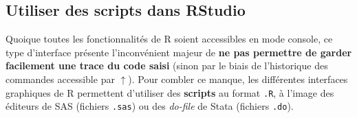 \documentclass[12pt,twosided, notitlepage]{book}
\newenvironment{Shaded}{}{}
\newcommand{\KeywordTok}[1]{\textcolor[rgb]{0.00,0.00,1.00}{#1}}
\newcommand{\DataTypeTok}[1]{#1}
\newcommand{\CommentTok}[1]{\textcolor[rgb]{0.00,0.50,0.00}{#1}}
\newcommand{\NormalTok}[1]{#1}
\newif \ifsol
\renewenvironment{Shaded}{\begin{snugshade}}{\end{snugshade}}
\begin{document}
\begin{enumerate}
  \ifsol 

  \begin{center} \rule{0.5\linewidth}{\linethickness}\end{center}

\begin{Shaded}
\begin{Highlighting}[]
\CommentTok{# Pour recherchez de l'aide sur une fonction, on utilise tout simplement ?}
\NormalTok{? rm}
\end{Highlighting}
\end{Shaded}

  \begin{figure}
  \centering
  \texttt{[image: ../figures/Aide\_rm.png]}
  \caption{Aide de la fonction rm()}
  \end{figure}

\begin{Shaded}
\begin{Highlighting}[]
\CommentTok{# L'argument list permet de spécifier les objets à supprimer}
\CommentTok{# sous la forme d'une vecteur de type caractère. Or c'est précisément}
\CommentTok{# ce que produit la fonction ls() :}
\KeywordTok{ls}\NormalTok{()}
\NormalTok{  ## [1] "duree" "min"   "sec"}

\CommentTok{# Pour supprimer tous les éléments en une seule commande, il suffit}
\CommentTok{# de spécifier le résultat de la commande ls() à l'argument list de la}
\CommentTok{# fonction rm() :}
\KeywordTok{rm}\NormalTok{(}\DataTypeTok{list =} \KeywordTok{ls}\NormalTok{())}

\CommentTok{# On vérifie alors qu'il n'y a plus aucun objet }
\CommentTok{# dans l'environnement de travail :}
\KeywordTok{ls}\NormalTok{()}
\NormalTok{  ## character(0)}
\end{Highlighting}
\end{Shaded}

  \begin{center} \rule{0.5\linewidth}{\linethickness}\end{center}

  \bigskip  \fi 
\end{enumerate}

\subsection{Utiliser des scripts dans
RStudio}\label{utiliser-des-scripts-dans-rstudio}

Quoique toutes les fonctionnalités de R soient accessibles en mode
console, ce type d'interface présente l'inconvénient majeur de
\textbf{ne pas permettre de garder facilement une trace du code saisi}
(sinon par le biais de l'historique des commandes accessible par
\(\uparrow\)). Pour combler ce manque, les différentes interfaces
graphiques de R permettent d'utiliser des \textbf{scripts} au format
\texttt{.R}, à l'image des éditeurs de SAS (fichiers \texttt{.sas}) ou
des \emph{do-file} de Stata (fichiers \texttt{.do}).
\end{document}
